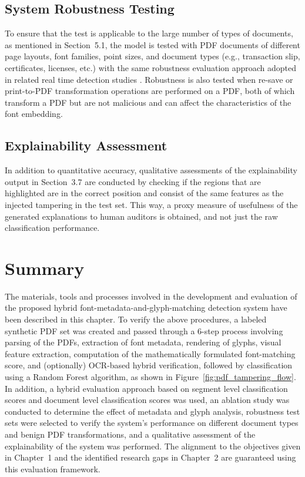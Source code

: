 \subsection{System Robustness Testing}

To ensure that the test is applicable to the large number of types of documents, as mentioned in Section~5.1, the model is tested with PDF documents of different page layouts, font families, point sizes, and document types (e.g., transaction slip, certificates, licenses, etc.) with the same robustness evaluation approach adopted in related real time detection studies \cite{Kumar2025RealTimeFraud}. Robustness is also tested when re-save or print-to-PDF transformation operations are performed on a PDF, both of which transform a PDF but are not malicious and can affect the characteristics of the font embedding.

\subsection{Explainability Assessment}

In addition to quantitative accuracy, qualitative assessments of the explainability output in Section~3.7 are conducted by checking if the regions that are highlighted are in the correct position and consist of the same features as the injected tampering in the test set. This way, a proxy measure of usefulness of the generated explanations to human auditors is obtained, and not just the raw classification performance.

\section{Summary}

The materials, tools and processes involved in the development and evaluation of the proposed hybrid font-metadata-and-glyph-matching detection system have been described in this chapter. To verify the above procedures, a labeled synthetic PDF set was created and passed through a 6-step process involving parsing of the PDFs, extraction of font metadata, rendering of glyphs, visual feature extraction, computation of the mathematically formulated font-matching score, and (optionally) OCR-based hybrid verification, followed by classification using a Random Forest algorithm, as shown in Figure~\ref{fig:pdf_tampering_flow}. In addition, a hybrid evaluation approach based on segment level classification scores and document level classification scores was used, an ablation study was conducted to determine the effect of metadata and glyph analysis, robustness test sets were selected to verify the system's performance on different document types and benign PDF transformations, and a qualitative assessment of the explainability of the system was performed. The alignment to the objectives given in Chapter~1 and the identified research gaps in Chapter~2 are guaranteed using this evaluation framework. 